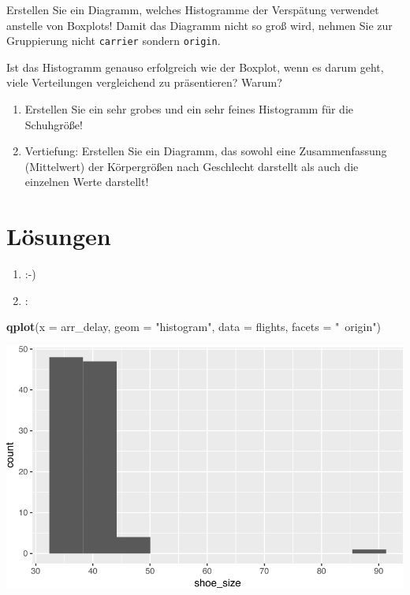 \documentclass[12pt,ngerman,]{book}
\newenvironment{Shaded}{\begin{snugshade}}{\end{snugshade}}
\newcommand{\KeywordTok}[1]{\textcolor[rgb]{0.13,0.29,0.53}{\textbf{{#1}}}}
\newcommand{\DataTypeTok}[1]{\textcolor[rgb]{0.13,0.29,0.53}{{#1}}}
\newcommand{\StringTok}[1]{\textcolor[rgb]{0.31,0.60,0.02}{{#1}}}
\newcommand{\NormalTok}[1]{{#1}}
\renewenvironment{Shaded}{\begin{kframe}}{\end{kframe}}
\begin{document}
Erstellen Sie ein Diagramm, welches Histogramme der Verspätung verwendet
anstelle von Boxplots! Damit das Diagramm nicht so groß wird, nehmen Sie
zur Gruppierung nicht \texttt{carrier} sondern \texttt{origin}.

Ist das Histogramm genauso erfolgreich wie der Boxplot, wenn es darum
geht, viele Verteilungen vergleichend zu präsentieren? Warum?

\begin{enumerate}
\def\labelenumi{\arabic{enumi}.}
\item
  Erstellen Sie ein sehr grobes und ein sehr feines Histogramm für die
  Schuhgröße!
\item
  Vertiefung: Erstellen Sie ein Diagramm, das sowohl eine
  Zusammenfassung (Mittelwert) der Körpergrößen nach Geschlecht
  darstellt als auch die einzelnen Werte darstellt!
\end{enumerate}

\section{Lösungen}\label{losungen}

\begin{enumerate}
\def\labelenumi{\arabic{enumi}.}
\item
  :-)
\item
  :
\end{enumerate}

\begin{Shaded}
\begin{Highlighting}[]
\KeywordTok{qplot}\NormalTok{(}\DataTypeTok{x =} \NormalTok{arr_delay, }\DataTypeTok{geom =} \StringTok{"histogram"}\NormalTok{, }\DataTypeTok{data =} \NormalTok{flights, }\DataTypeTok{facets =} \StringTok{"~origin"}\NormalTok{)}
\end{Highlighting}
\end{Shaded}

\begin{center}\includegraphics[width=0.7\linewidth]{050_Daten_visualisieren_files/figure-latex/unnamed-chunk-31-1} \end{center}
\end{document}
